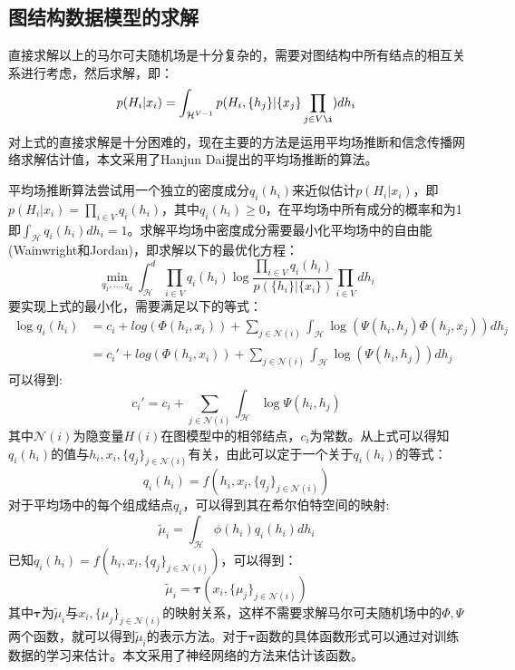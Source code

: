 \subsection{图结构数据模型的求解}
直接求解以上的马尔可夫随机场是十分复杂的，需要对图结构中所有结点的相互关系进行考虑，然后求解，即：
\begin{equation}
p(H_i|{x_i}) = \int_{\mathcal{H}^{V-1}} p(H_i, \{h_j\}| \{x_j\}\prod_{j\in V\i})dh_i
\end{equation}
对上式的直接求解是十分困难的，现在主要的方法是运用平均场推断和信念传播网络求解估计值，本文采用了Hanjun Dai\cite{dai2016discriminative}提出的平均场推断的算法。
\par 平均场推断算法尝试用一个独立的密度成分$q_i(h_i)$来近似估计$p(H_i|{x_i})$，即$p(H_i|{x_i})=\prod_{i\in V} q_i(h_i)$，其中$q_i(h_i)\ge 0$，在平均场中所有成分的概率和为1即$\int_\mathcal{H} q_i(h_i)dh_i=1$。求解平均场中密度成分需要最小化平均场中的自由能(Wainwright和Jordan\cite{wainwright2008graphical})，即求解以下的最优化方程：
\begin{equation}
\min_{q_1, ..., q_d} \int_\mathcal{H}^d \prod_{i\in V}q_i(h_i)\log \frac{\prod_{i\in V}q_i(h_i)}{p(\{h_i\}|\{x_i\})}\prod_{i\in V}dh_i
\end{equation}
要实现上式的最小化，需要满足以下的等式：
\begin{align}
\log q_i(h_i) &= c_i + log( \Phi(h_i, x_i)) + \sum_{j\in \mathcal{N}(i)} \int_\mathcal{H}\log (\Psi(h_i, h_j) \Phi(h_j, x_j))dh_j\\
&={c_i}'+ log( \Phi(h_i, x_i)) + \sum_{j\in \mathcal{N}(i)} \int_\mathcal{H}\log (\Psi(h_i, h_j))dh_j
\end{align}
可以得到:
$$c_i' = c_i + \sum_{j\in \mathcal{N}(i)} \int_\mathcal{H}\log \Psi(h_i, h_j)  $$
其中$\mathcal{N}(i)$为隐变量$H(i)$在图模型中的相邻结点，$c_i$为常数。从上式可以得知$q_i(h_i)$的值与$h_i, x_i, \{q_j\}_{j\in \mathcal{N}(i)}$有关，由此可以定于一个关于$q_i(h_i)$的等式：
\begin{equation}
q_i(h_i) =  f(h_i, x_i,  \{q_j\}_{j\in \mathcal{N}(i)})
\end{equation}
对于平均场中的每个组成结点$q_i$，可以得到其在希尔伯特空间的映射:
\begin{equation}
\tilde{\mu}_i = \int_{\mathcal{H}} \phi(h_i)q_i(h_i)dh_i
\end{equation}
已知$q_i(h_i) =  f(h_i, x_i,  \{q_j\}_{j\in \mathcal{N}(i)})$，可以得到：
\begin{equation}
\tilde{\mu}_i = \boldsymbol{\tau} (x_i, \{\mu_j\}_{j\in \mathcal{N}(i)})
\end{equation}
其中$\boldsymbol{\tau}$为$\tilde{\mu}_i$与$x_i, \{\mu_j\}_{j\in \mathcal{N}(i)}$的映射关系，这样不需要求解马尔可夫随机场中的$\Phi, \Psi$两个函数，就可以得到$\tilde{\mu}_i$的表示方法。对于$\boldsymbol{\tau}$函数的具体函数形式可以通过对训练数据的学习来估计。本文采用了神经网络的方法来估计该函数。
